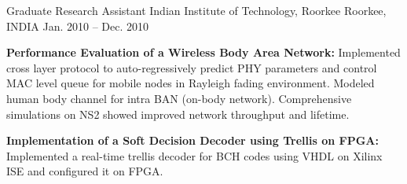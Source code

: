 \begin{cventries}
  \cventry
    {Graduate Research Assistant} %
    {Indian Institute of Technology, Roorkee} %
    {Roorkee, INDIA} %
    {Jan. 2010 -- Dec. 2010} %
    {
      \begin{cvitems} %
      \item {\textbf{Performance Evaluation of a Wireless Body Area Network:} Implemented cross layer protocol to auto-regressively predict PHY parameters and control MAC level queue for mobile nodes in Rayleigh fading environment. Modeled human body channel for intra BAN (on-body network). Comprehensive simulations on NS2 showed improved network throughput and lifetime.
      		}
      \item {\textbf{Implementation of a Soft Decision Decoder using Trellis on FPGA:} Implemented a real-time trellis decoder for BCH codes using VHDL on Xilinx ISE and configured it on FPGA.}
    \end{cvitems}
    }
    
\end{cventries}

%
%
%
%
%
%
